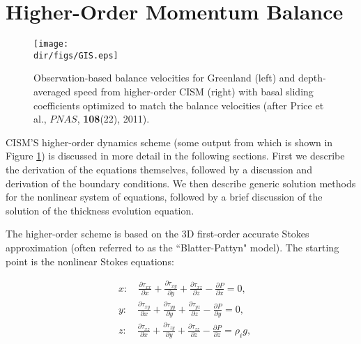 
\section{Higher-Order Momentum Balance}
\label{sc:higher-order-mom}

\begin{figure}
  \begin{center}
    \texttt{[image: \\dir/figs/GIS.eps]}
   \end{center}
  \caption{Observation-based balance velocities for Greenland (left) and depth-averaged speed from higher-order CISM (right) with basal sliding coefficients optimized to match the balance velocities (after Price et al., $PNAS$, \textbf{108}(22), 2011).}
  \label{fig:GIS_PNAS}
\end{figure} 

CISM'S higher-order dynamics scheme (some output from which is shown in Figure \ref{fig:GIS_PNAS}) is discussed in more detail in the following sections. 
First we describe the derivation of the equations themselves, followed by a discussion and derivation of the boundary conditions.
We then describe generic solution methods for the nonlinear system of equations, followed by a
brief discussion of the solution of the thickness evolution equation.


The higher-order scheme is based on the 3D first-order accurate Stokes approximation (often referred to as the ``Blatter-Pattyn" model). The starting point is the nonlinear Stokes equations:

\begin{equation}
  \begin{split}
    & x:\quad \frac{\partial \tau _{xx}}{\partial x} + \frac{\partial \tau _{xy}}{\partial y} + \frac{\partial \tau _{xz}}{\partial z} - \frac{\partial P}{\partial x} = 0, \\ 
    & y:\quad \frac{\partial \tau _{xy}}{\partial x} + \frac{\partial \tau _{yy}}{\partial y} + \frac{\partial \tau _{yz}}{\partial z} - \frac{\partial P}{\partial y} = 0, \\ 
    & z:\quad \frac{\partial \tau _{xz}}{\partial x} + \frac{\partial \tau _{zy}}{\partial y} + \frac{\partial \tau _{zz}}{\partial z} - \frac{\partial P}{\partial z} = \rho_i g,
  \end{split}
\end{equation}

